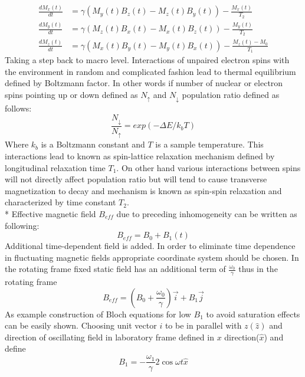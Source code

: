 \begin{subequations}\label{eq:bloch}
\begin{align}
\frac{dM_x(t)}{dt}& =\gamma(M_y(t)B_z(t)-M_z(t)B_y(t))-\frac{M_x(t)}{T_2} \\
\frac{dM_y(t)}{dt}& =\gamma(M_z(t)B_x(t)-M_x(t)B_z(t))-\frac{M_y(t)}{T_2} \\
\frac{dM_z(t)}{dt} & =\gamma(M_x(t)B_y(t)-M_y(t)B_x(t))-\frac{M_z(t)-M_0}{T_1} 
\end{align}
\end{subequations}
Taking a step back to macro level. Interactions of unpaired electron spins with the environment in random and complicated fashion lead to thermal equilibrium defined by Boltzmann factor. In other words if number of nuclear or electron spins pointing up or down defined as $N_{\uparrow}$ and $N_{\downarrow}$ population ratio defined as follows:
\begin{equation}\label{eq:8}
\frac{N_{\downarrow}}{N_{\uparrow}}=exp(-\Delta E/k_{b}T)
\end{equation}
Where $k_b$ is a Boltzmann constant and $T$ is a sample temperature. This interactions lead to known as spin-lattice relaxation mechanism defined by longitudinal relaxation time $T_1$. 
On other hand various interactions between spins will not directly affect population ratio but will tend to cause transverse magnetization to decay and mechanism is known as spin-spin relaxation and characterized by time constant $T_{2}$. \\*
Effective magnetic field $B_{eff}$ due to preceding inhomogeneity can be written as following:
\begin{equation}\label{eq:inhomog2}
B_{eff}=B_0+B_1(t)
\end{equation}
Additional time-dependent field is added. In order to eliminate time dependence in fluctuating magnetic fields appropriate coordinate system should be chosen. In the rotating frame fixed static field has an additional term of $\frac{\omega_0}{\gamma}$ thus in the rotating frame
\begin{equation}\label{eq:inhomog}
B_{eff}=(B_0+\frac{\omega_0}{\gamma})\vec{i}+B_1\vec{j}
\end{equation}
As example construction of Bloch equations for low $B_1$ to avoid saturation effects can be easily shown. Choosing unit vector $i$ to be in parallel with $z(\hat{z})$ and direction of oscillating field in laboratory frame defined in $x$ direction($\hat{x}$)  and define 
 \begin{equation}\label{eq:inhomog3}
B_1=-\frac{\omega_1}{\gamma}2\cos\omega t\hat{x}
\end{equation}
